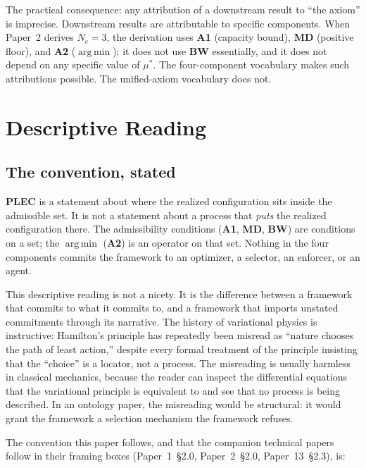 \documentclass[11pt]{article}
\newcommand{\Aone}{\textbf{A1}}
\newcommand{\PLEC}{\textbf{PLEC}}
\newcommand{\argmin}{\mathop{\mathrm{arg\,min}}}
\begin{document}
\noindent The practical consequence: any attribution of a downstream result to ``the axiom'' is imprecise. Downstream results are attributable to specific components. When Paper~2 derives $N_c = 3$, the derivation uses \Aone{} (capacity bound), \textbf{MD} (positive floor), and \textbf{A2} ($\argmin$); it does not use \textbf{BW} essentially, and it does not depend on any specific value of $\mu^*$. The four-component vocabulary makes such attributions possible. The unified-axiom vocabulary does not.

\clearpage

\section{Descriptive Reading}\label{sec:descriptive_reading}

\subsection{The convention, stated}\label{sec:descriptive_convention}

\PLEC{} is a statement about where the realized configuration sits inside the admissible set. It is not a statement about a process that \emph{puts} the realized configuration there. The admissibility conditions (\Aone{}, \textbf{MD}, \textbf{BW}) are conditions on a set; the $\argmin$ (\textbf{A2}) is an operator on that set. Nothing in the four components commits the framework to an optimizer, a selector, an enforcer, or an agent.

This descriptive reading is not a nicety. It is the difference between a framework that commits to what it commits to, and a framework that imports unstated commitments through its narrative. The history of variational physics is instructive: Hamilton's principle has repeatedly been misread as ``nature chooses the path of least action,'' despite every formal treatment of the principle insisting that the ``choice'' is a locator, not a process. The misreading is usually harmless in classical mechanics, because the reader can inspect the differential equations that the variational principle is equivalent to and see that no process is being described. In an ontology paper, the misreading would be structural: it would grant the framework a selection mechanism the framework refuses.

The convention this paper follows, and that the companion technical papers follow in their framing boxes (Paper~1~\S2.0, Paper~2~\S2.0, Paper~13~\S2.3), is:
\end{document}
